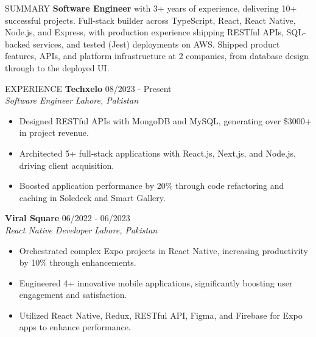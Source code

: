 \documentclass{resume}
\begin{document}
\begin{rSection}{SUMMARY}
\textbf{Software Engineer} with 3+ years of experience, delivering 10+ successful projects. Full-stack builder across TypeScript, React, React Native, Node.js, and Express, with production experience shipping RESTful APIs, SQL-backed services, and tested (Jest) deployments on AWS. Shipped product features, APIs, and platform infrastructure at 2 companies, from database design through to the deployed UI.
\end{rSection}
\begin{rSection}{EXPERIENCE}
\textbf{Techxelo} \hfill 08/2023 - Present \\
\textit{Software Engineer}  \hfill \textit{Lahore, Pakistan}
\begin{itemize}
\itemsep -3pt {}
\item Designed RESTful APIs with MongoDB and MySQL, generating over \$3000+ in project revenue.
\item Architected 5+ full-stack applications with React.js, Next.js, and Node.js, driving client acquisition.
\item Boosted application performance by 20\% through code refactoring and caching in Soledeck and Smart Gallery.
\end{itemize}
\textbf{Viral Square} \hfill 06/2022 - 06/2023 \\
\textit{React Native Developer} \hfill \textit{Lahore, Pakistan}
\begin{itemize}
\itemsep -3pt {}
\item Orchestrated complex Expo projects in React Native, increasing productivity by 10\% through enhancements.
\item Engineered 4+ innovative mobile applications, significantly boosting user engagement and satisfaction.
\item Utilized React Native, Redux, RESTful API, Figma, and Firebase for Expo apps to enhance performance.
\end{itemize}
\end{rSection}
\end{document}
